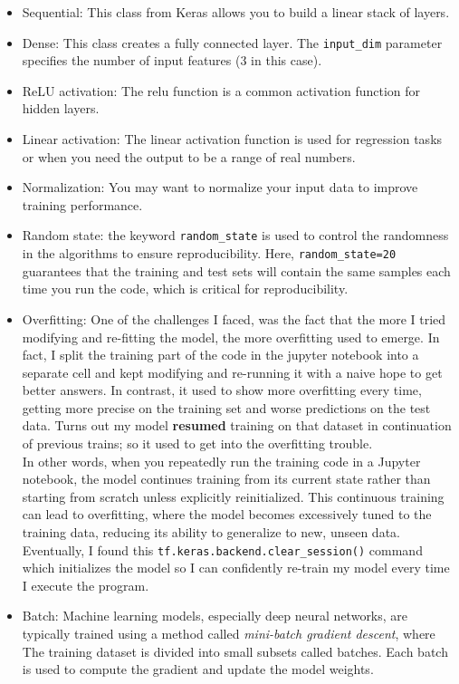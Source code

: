 \documentclass[conference]{IEEEtran}
\begin{document}
\begin{itemize}
    \item Sequential: This class from Keras allows you to build a linear stack of layers.
    \item Dense: This class creates a fully connected layer. The \texttt{input\_dim} parameter specifies the number of input features (3 in this case).
    \item ReLU activation: The relu function is a common activation function for hidden layers.
    \item Linear activation: The linear activation function is used for regression tasks or when you need the output to be a range of real numbers.
    \item Normalization: You may want to normalize your input data to improve training performance.
    \item Random state: the keyword \texttt{random\_state} is used to control the randomness in the algorithms to ensure reproducibility. Here, \texttt{random\_state=20} guarantees that the training and test sets will contain the same samples each time you run the code, which is critical for reproducibility.
    \item Overfitting: One of the challenges I faced, was the fact that the more I tried modifying and re-fitting the model, the more overfitting used to emerge. In fact, I split the training part of the code in the jupyter notebook into a separate cell and kept modifying and re-running it with a naive hope to get better answers. In contrast, it used to show more overfitting every time, getting more precise on the training set and worse predictions on the test data. Turns out my model \textbf{resumed} training on that dataset in continuation of previous trains; so it used to get into the overfitting trouble. \\
          In other words, when you repeatedly run the training code in a Jupyter notebook, the model continues training from its current state rather than starting from scratch unless explicitly reinitialized. This continuous training can lead to overfitting, where the model becomes excessively tuned to the training data, reducing its ability to generalize to new, unseen data. Eventually, I found this \texttt{tf.keras.backend.clear\_session()} command which initializes the model so I can confidently re-train my model every time I execute the program.
    \item Batch: Machine learning models, especially deep neural networks, are typically trained using a method called \textit{mini-batch gradient descent}, where The training dataset is divided into small subsets called batches. Each batch is used to compute the gradient and update the model weights. \\

\end{itemize}
\end{document}
